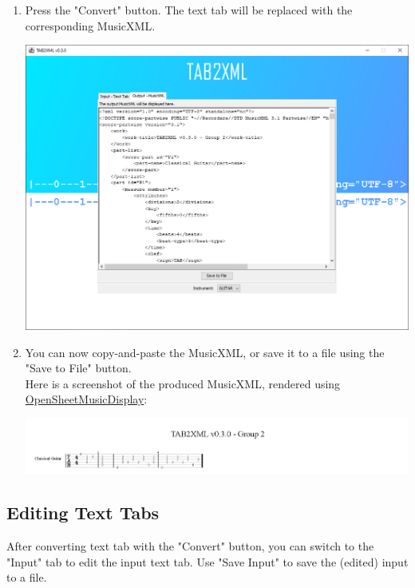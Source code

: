 \documentclass[11pt]{article}
\begin{document}
\begin{enumerate}
\begin{center}
\end{center}
\item Press the "Convert" button.  The text tab will be replaced with the corresponding MusicXML.
\begin{center}
\includegraphics[width=.9\linewidth]{../Screenshots/converted-20210317-tabbedview.png}
\end{center}
\item You can now copy-and-paste the MusicXML, or save it to a file using the "Save to File" button. \\
Here is a screenshot of the produced MusicXML, rendered using \href{https://opensheetmusicdisplay.github.io/demo/}{OpenSheetMusicDisplay}:
\begin{center}
\includegraphics[width=.9\linewidth]{../Screenshots/converted-20210317-opensheetmusicdisplay.png}
\end{center}
\end{enumerate}
\subsection{Editing Text Tabs}
\label{sec:org6029bdd}
After converting text tab with the "Convert" button, you can switch to the "Input" tab to edit the input text tab.  Use "Save Input" to save the (edited) input to a file.
\end{document}
